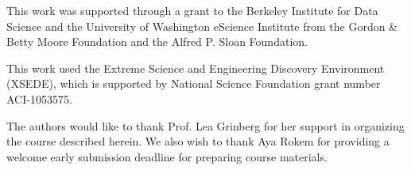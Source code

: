 





\begin{acks}

This work was supported through a grant to the Berkeley Institute for Data
Science and the University of Washington eScience Institute from the Gordon \&
Betty Moore Foundation and the Alfred P. Sloan Foundation.

This work used the Extreme Science and Engineering Discovery Environment
(XSEDE), which is supported by National Science Foundation grant number
ACI-1053575.

The authors would like to thank Prof. Lea Grinberg for her support in organizing
the course described herein. We also wish to thank Aya Rokem for providing
a welcome early submission deadline for preparing course materials.

\end{acks}
